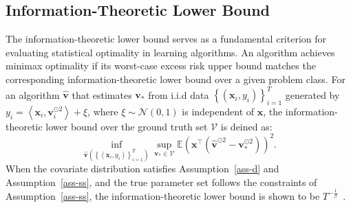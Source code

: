 \subsection{Information-Theoretic Lower Bound}
The information-theoretic lower bound serves as a fundamental criterion for evaluating statistical optimality in learning algorithms. An algorithm achieves minimax optimality if its worst-case excess risk upper bound matches the corresponding information-theoretic lower bound over a given problem class. For an algorithm $\hat{\mathbf{v} } $ that estimates $\mathbf{v}_*$  from i.i.d data $\left \{ \left ( \mathbf{x}_i,y_i  \right )  \right \} _{i=1}^T$ generated by $y_i=\left \langle \mathbf{x}_i ,\mathbf{v}_i ^{\odot 2} \right \rangle +\xi $, where $\xi \sim \mathcal{N}(0,1)$ is independent of $\mathbf{x}$, the information-theoretic lower bound over the ground truth set $\mathcal{V}$ is deined as:
\begin{equation}
    \inf_{\hat{\mathbf{v} } \left ( \left \{ \left ( \mathbf{x}_i,y_i  \right )  \right \} _{i=1}^T \right ) }\sup_{\mathbf{v_{*}}\in \mathcal{V} }\mathbb{E}\left ( \mathbf{x}^{\top}\left ( \hat{\mathbf{v} } ^{\odot 2}-\mathbf{v}_*^{\odot 2}  \right )   \right ) ^2 .
\end{equation}
When the covariate distribution satisfies Assumption~\ref{ass-d} and Assumption~\ref{ass-ss}, and the true parameter set follows the constraints of Assumption~\ref{ass-ss}, the information-theoretic lower bound is shown to be $T^{-\frac{1}{\beta}}$~\citep{zhang2024optimality}.  
\fi 
